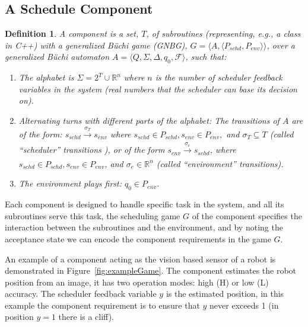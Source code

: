 \documentclass[ twoside, 12pt ]{article}
\newcommand\R{{\mathbb R}}
\newtheorem{dfn}{Definition} %
\newcommand{\commentOut}[1]{}
\begin{document}
\subsection{A Schedule Component}

\commentOut{ %
\begin{dfn}
    A component is a set of subroutines (software functions) $T$ with a non-deterministic B{\"u}chi automaton (NBA) $A= \left < Q,\Sigma,\Delta,Q_0,Acc \right > $ called  ``Guarded automaton'', with the \textit{alphabet} is $\Sigma = 2^{T} \times \R^n$ where $n$ is the number of scheduler feedback variables in the system.
\end{dfn}
}

\begin{dfn}
    A component is a set, $T$, of subroutines (representing, e.g., a class in C++) with a generalized B{\"u}chi game (GNBG), $G=\langle A,\langle P_{schd}, P_{env}\rangle \rangle$, over a generalized B{\"u}chi automaton $A= \langle Q,\Sigma,\Delta,q_0,\mathcal{F} \rangle $, such that:
    \begin{enumerate}
        \item The \textit{alphabet} is $\Sigma = 2^{T} \cup \R^n$ where $n$ is the number of scheduler feedback variables in the system (real numbers that the scheduler can base its decision on).
        \item 
        Alternating turns with different parts of the alphabet:
       	The transitions of $A$ are of the form: $s_{schd} \xrightarrow[]{\sigma_{T}} s_{env}$ where $s_{schd} \in P_{schd}, s_{env} \in P_{env},$ and $\sigma_{T} \subseteq T$ (called  ``scheduler'' transitions ),  or of the form $s_{env} \xrightarrow[]{\sigma_{e}} s_{schd}$, where $s_{schd} \in P_{schd}, s_{env} \in P_{env}$, and $\sigma_{e} \in \R^n$ (called ``environment'' transitions).
        \item The environment plays first: $q_0 \in P_{env}$.
    \end{enumerate}
\end{dfn}

Each component is designed to handle specific task in the system, and all its subroutines serve this task, the scheduling game $G$ of the component specifies the interaction between the subroutines and the environment, and by noting the acceptance state we can encode the component requirements in the game $G$.

An example of a component acting as the vision based sensor of a robot is demonstrated in Figure~\ref{fig:exampleGame}. 
The component estimates the robot position from an image, it has two operation modes: high (H) or low (L) accuracy.
The scheduler feedback variable $y$ is the estimated position, in this example the component requirement is to ensure that $y$ never exceeds 1 (in position $y=1$ there is a cliff).
\end{document}
